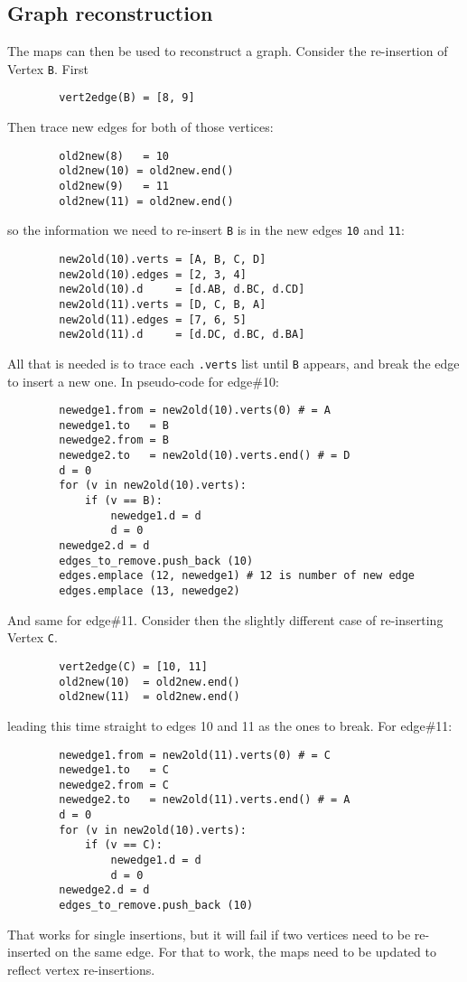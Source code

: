 \begin{spacing}{1.5}
    \pagebreak
    \vspace{12pt}\subsection{Graph reconstruction}

    \noindent The maps can then be used to reconstruct a graph. Consider the re-insertion of Vertex {\tt B}. First
    \begin{lstlisting}
        vert2edge(B) = [8, 9]
    \end{lstlisting}
    Then trace new edges for both of those vertices:
    \begin{lstlisting}
        old2new(8)   = 10
        old2new(10) = old2new.end()
        old2new(9)   = 11
        old2new(11) = old2new.end()
    \end{lstlisting}
    so the information we need to re-insert {\tt B} is in the new edges {\tt 10} and {\tt 11}:
    \begin{lstlisting}
        new2old(10).verts = [A, B, C, D]
        new2old(10).edges = [2, 3, 4]
        new2old(10).d     = [d.AB, d.BC, d.CD]
        new2old(11).verts = [D, C, B, A]
        new2old(11).edges = [7, 6, 5]
        new2old(11).d     = [d.DC, d.BC, d.BA]
    \end{lstlisting}
    All that is needed is to trace each {\tt .verts} list until {\tt B} appears, and break the edge to insert a new one. In pseudo-code for
    edge\#10:
    \begin{lstlisting}
        newedge1.from = new2old(10).verts(0) # = A
        newedge1.to   = B
        newedge2.from = B
        newedge2.to   = new2old(10).verts.end() # = D
        d = 0
        for (v in new2old(10).verts):
            if (v == B):
                newedge1.d = d
                d = 0
        newedge2.d = d
        edges_to_remove.push_back (10)
        edges.emplace (12, newedge1) # 12 is number of new edge
        edges.emplace (13, newedge2)
    \end{lstlisting}
    And same for edge\#11.  Consider then the slightly different case of re-inserting Vertex {\tt C}.
    \begin{lstlisting}
        vert2edge(C) = [10, 11]
        old2new(10)  = old2new.end()
        old2new(11)  = old2new.end()
    \end{lstlisting}
    leading this time straight to edges 10 and 11 as the ones to break. For edge\#11:
    \pagebreak
    \begin{lstlisting}
        newedge1.from = new2old(11).verts(0) # = C
        newedge1.to   = C
        newedge2.from = C
        newedge2.to   = new2old(11).verts.end() # = A
        d = 0
        for (v in new2old(10).verts):
            if (v == C):
                newedge1.d = d
                d = 0
        newedge2.d = d
        edges_to_remove.push_back (10)
    \end{lstlisting}
    That works for single insertions, but it will fail if two vertices need to be re-inserted on the same edge. For that to work, the maps need
    to be updated to reflect vertex re-insertions.


\end{spacing}
